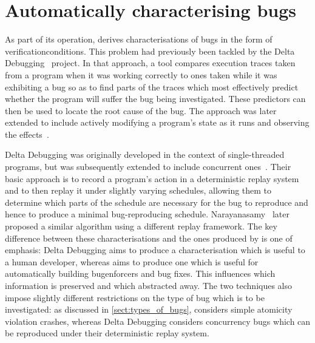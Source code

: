 \section{Automatically characterising bugs}
\label{sect:rw:auto_characterise}

As part of its operation, {\technique} derives characterisations of
bugs in the form of \glspl{verificationcondition}.  This problem had
previously been tackled by the Delta Debugging~\cite{Cleve2005}
project.  In that approach, a tool compares execution traces taken
from a program when it was working correctly to ones taken while it
was exhibiting a bug so as to find parts of the traces which most
effectively predict whether the program will suffer the bug being
investigated.  These predictors can then be used to locate the root
cause of the bug.  The approach was later extended to include actively
modifying a program's state as it runs and observing the
effects~\cite{Jeffrey2009}.

Delta Debugging was originally developed in the context of
single-threaded programs, but was subsequently extended to include
concurrent ones~\cite{Choi2002}.  Their basic approach is to record a
program's action in a deterministic replay system and to then replay
it under slightly varying schedules, allowing them to determine which
parts of the schedule are necessary for the bug to reproduce and hence
to produce a minimal bug-reproducing schedule.
Narayanasamy~\cite{Narayanasamy2007} later proposed a similar
algorithm using a different replay framework.  The key difference
between these characterisations and the ones produced by {\technique}
is one of emphasis: Delta Debugging aims to produce a characterisation
which is useful to a human developer, whereas {\technique} aims to
produce one which is useful for automatically building
\glspl{bugenforcer} and bug fixes.  This influences which information
is preserved and which abstracted away.  The two techniques also
impose slightly different restrictions on the type of bug which is to
be investigated: as discussed in \autoref{sect:types_of_bugs},
{\technique} considers simple atomicity violation crashes, whereas
Delta Debugging considers concurrency bugs which can be reproduced
under their deterministic replay system.


